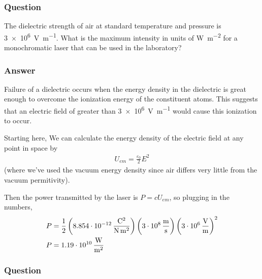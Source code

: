 \subsubsection{Question}

The dielectric strength of air at standard temperature and pressure is
\SI{3e6}{\V\per\m}. What is the maximum intensity in units of \si{\W\per\m^2}
for a monochromatic laser that can be used in the laboratory?

\subsubsection{Answer}
Failure of a dielectric occurs when the energy density in the dielectric is
great enough to overcome the ionization energy of the constituent atoms. This
suggests that an electric field of greater than \SI{3e6}{\V\per\m} would cause
this ionization to occur.

Starting here, We can calculate the energy density of the electric field at any
point in space by
\begin{align*}
	U_{em} = \frac{\varepsilon _0}{2}E^2
\end{align*}
(where we've used the vacuum energy density since air differs very little from
the vacuum permitivity).

Then the power transmitted by the laser is $P = cU_{em}$, so plugging in the
numbers,
\begin{align*}
	P &= \frac{1}{2}
		\left( \SI[per-mode=fraction]{8.854e-12}
			{\coulomb\squared\per\N\per\m\squared} \right)
		\left( \SI{3e8}{\m\per\s} \vphantom{\frac{V}{V}} \right)
		\left( \SI{3e6}{\V\per\m} \right)^2 \\
	P &= \SI{1.19e10}{\W\per\m\squared}
\end{align*}

\begin{center}
\end{center}

\subsubsection{Question}

